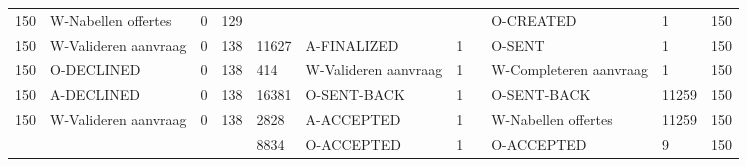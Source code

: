 \begin{tabular}{lllllllllll}
150 & W-Nabellen offertes & 0 & 129 &  &  &  &  & O-CREATED & 1 & 150 \\
150 & W-Valideren aanvraag & 0 & 138 & 11627 & A-FINALIZED & 1 &  & O-SENT & 1 & 150 \\
150 & O-DECLINED & 0 & 138 & 414 & W-Valideren aanvraag & 1 &  & W-Completeren aanvraag & 1 & 150 \\
150 & A-DECLINED & 0 & 138 & 16381 & O-SENT-BACK & 1 &  & O-SENT-BACK & 11259 & 150 \\
150 & W-Valideren aanvraag & 0 & 138 & 2828 & A-ACCEPTED & 1 &  & W-Nabellen offertes & 11259 & 150 \\
 &  &  &  & 8834 & O-ACCEPTED & 1 &  & O-ACCEPTED & 9 & 150 \\
\bottomrule
\end{tabular}
